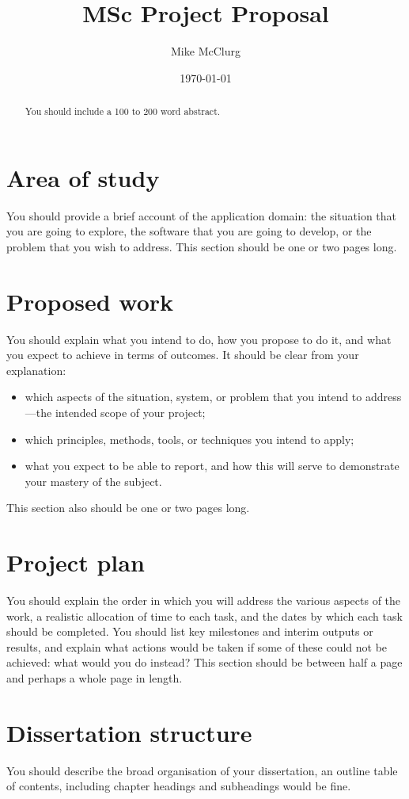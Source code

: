 \documentclass[proposal]{softeng}
\title{MSc Project Proposal}
\author{Mike McClurg}
\date{\today}
\begin{document}
\maketitle

\begin{abstract}
You should include a 100 to 200 word abstract.
\end{abstract}
 
\section{Area of study}

You should provide a brief account of the application domain: the
situation that you are going to explore, the software that you are
going to develop, or the problem that you wish to address.  This
section should be one or two pages long. 

\section{Proposed work}

You should explain what you intend to do, how you propose to do it,
and what you expect to achieve in terms of outcomes.  It should be
clear from your explanation:
\begin{itemize}
\item which aspects of the situation, system, or problem that you intend
  to address---the intended scope of your project;
\item which principles, methods, tools, or techniques you intend to
  apply;
\item what you expect to be able to report, and how this will serve to
  demonstrate your mastery of the subject.
\end{itemize}
This section also should be one or two pages long. 

\section{Project plan}

You should explain the order in which you will address the various
aspects of the work, a realistic allocation of time to each task, and
the dates by which each task should be completed.  You should list key
milestones and interim outputs or results, and explain what actions
would be taken if some of these could not be achieved: what would you
do instead?   This section should be between half a page and perhaps a
whole page in length.  

\section{Dissertation structure}

You should describe the broad organisation of your dissertation, an
outline table of contents, including chapter headings and subheadings
would be fine.

\nocite{*}


\end{document}
